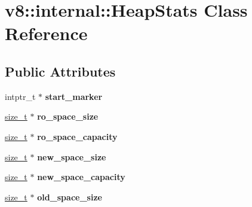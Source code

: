 \hypertarget{classv8_1_1internal_1_1HeapStats}{}\section{v8\+:\+:internal\+:\+:Heap\+Stats Class Reference}
\label{classv8_1_1internal_1_1HeapStats}
\subsection*{Public Attributes}
\begin{DoxyCompactItemize}
\item 
\mbox{\label{classv8_1_1internal_1_1HeapStats_af2696b84b5a32ab0548f2f7a05dcd8b1}} 
intptr\+\_\+t $\ast$ {\bfseries start\+\_\+marker}
\item 
\mbox{\label{classv8_1_1internal_1_1HeapStats_a8935418ca03867d263b0d7126ecc4f41}} 
\mbox{\hyperlink{classsize__t}{size\+\_\+t}} $\ast$ {\bfseries ro\+\_\+space\+\_\+size}
\item 
\mbox{\label{classv8_1_1internal_1_1HeapStats_a29c46718a6fd2d2dea00a00999847ef0}} 
\mbox{\hyperlink{classsize__t}{size\+\_\+t}} $\ast$ {\bfseries ro\+\_\+space\+\_\+capacity}
\item 
\mbox{\label{classv8_1_1internal_1_1HeapStats_a56fdf349eb6fe007859a287f28234b0a}} 
\mbox{\hyperlink{classsize__t}{size\+\_\+t}} $\ast$ {\bfseries new\+\_\+space\+\_\+size}
\item 
\mbox{\label{classv8_1_1internal_1_1HeapStats_a2db37bdfe82f89fef77218af88f6f8ec}} 
\mbox{\hyperlink{classsize__t}{size\+\_\+t}} $\ast$ {\bfseries new\+\_\+space\+\_\+capacity}
\item 
\mbox{\label{classv8_1_1internal_1_1HeapStats_a8d8423c596f339790cab45474e731a70}} 
\mbox{\hyperlink{classsize__t}{size\+\_\+t}} $\ast$ {\bfseries old\+\_\+space\+\_\+size}
\item 
\mbox{\label{classv8_1_1internal_1_1HeapStats_a2a83c559c9fd724c83fa8bcc7846efd0}} 

\end{DoxyCompactItemize}
